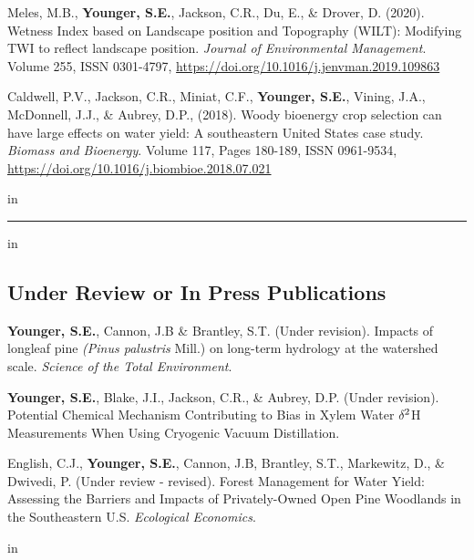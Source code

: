 \documentclass[10pt,letterpaper]{article}
\begin{document}
\begin{hangparas}{.25in}{1}
		Meles, M.B., \textbf{Younger, S.E.}, Jackson, C.R., Du, E., \& Drover, D. (2020). Wetness Index based on Landscape position and Topography (WILT): Modifying TWI to reflect landscape position. \textit{Journal of Environmental Management}. Volume 255, ISSN 0301-4797, \url{https://doi.org/10.1016/j.jenvman.2019.109863}
		
		Caldwell, P.V., Jackson, C.R., Miniat, C.F., \textbf{Younger, S.E.}, Vining, J.A., McDonnell, J.J., \& Aubrey, D.P., (2018). Woody bioenergy crop selection can have large effects on water yield: A southeastern United States case study.
		\textit{Biomass and Bioenergy}. Volume 117, Pages 180-189, ISSN 0961-9534, \url{https://doi.org/10.1016/j.biombioe.2018.07.021}
		
		 in
		\vspace{-0.4em}
		
	\end{hangparas}

\newpage

\hrule
\vspace{-0.4em}
 in
\subsection*{Under Review or In Press Publications}

\begin{hangparas}{.25in}{1}
	
	\textbf{Younger, S.E.}, Cannon, J.B \& Brantley, S.T. (Under revision). Impacts of longleaf pine \textit{(Pinus palustris} Mill.) on long-term hydrology at the watershed scale. \textit{Science of the Total Environment}.
	
	\textbf{Younger, S.E.}, Blake, J.I., Jackson, C.R., \& Aubrey, D.P. (Under revision). Potential Chemical Mechanism Contributing to Bias in Xylem Water $\delta$$\textsuperscript{2}$H Measurements When Using Cryogenic Vacuum Distillation.
	
	English, C.J., \textbf{Younger, S.E.}, Cannon, J.B, Brantley, S.T., Markewitz, D., \& Dwivedi, P. (Under review - revised). Forest Management for Water Yield: Assessing the Barriers and Impacts of Privately-Owned Open Pine Woodlands in the Southeastern U.S. \textit{Ecological Economics}.
	
	 in
	\vspace{-0.4em}
	
\end{hangparas}
	
\end{document}
